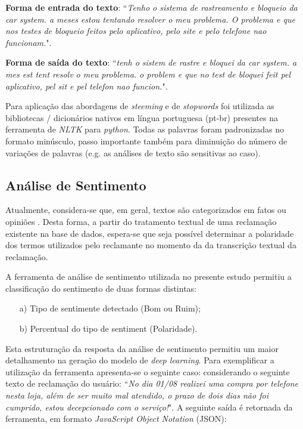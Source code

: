 \documentclass[12pt]{article}
\begin{document}
\textbf{Forma de entrada do texto}: ``\emph{Tenho o sistema de rastreamento e bloqueio da car system. a meses estou tentando resolver o meu problema. O problema e que nos testes de bloqueio feitos pelo aplicativo, pelo site e pelo telefone nao funcionam.}". 

\textbf{Forma de saída do texto}: ``\emph{tenh o sistem de rastre e bloquei da car system. a mes est tent resolv o meu problema. o problem e que no test de bloquei feit pel aplicativo, pel sit e pel telefon nao funcion.}".

Para aplicação das abordagens de \emph{steeming} e de \emph{stopwords} foi utilizada as bibliotecas / dicionários nativos em língua portuguesa (pt-br) presentes na ferramenta de \emph{NLTK} para \emph{python}. Todas as palavras foram padronizadas no formato minúsculo, passo importante também para diminuição do número de variações de palavras (e.g. as análises de texto são sensitivas ao caso).

\subsection{Análise de Sentimento}\label{sec:sentiment}

Atualmente, considera-se que, em geral, textos são categorizados em fatos ou opiniões \cite{liu:10}. Desta forma, a partir do tratamento textual de uma reclamação existente na base de dados, espera-se que seja possível determinar a polaridade dos termos utilizados pelo reclamante no momento da da transcrição textual da reclamação.

A ferramenta de análise de sentimento utilizada no presente estudo permitiu a classificação do sentimento de duas formas distintas: 

\begin{itemize}
   \item[a)] Tipo de sentimente detectado (Bom ou Ruim);
   \item[b)] Percentual do tipo de sentiment (Polaridade). 
\end{itemize}

Esta estruturação da resposta da análise de sentimento permitiu um maior detalhamento na geração do modelo de \emph{deep learning}. Para exemplificar a utilização da ferramenta apresenta-se o seguinte caso: considerando o seguinte texto de reclamação do usuário: ``\emph{No dia 01/08 realizei uma compra por telefone nesta loja, além de ser muito mal atendido, o prazo de dois dias não foi cumprido, estou decepcionado com o serviço!}". A seguinte saída é retornada da ferramenta, em formato \emph{JavaScript Object Notation} (JSON): 
\end{document}
